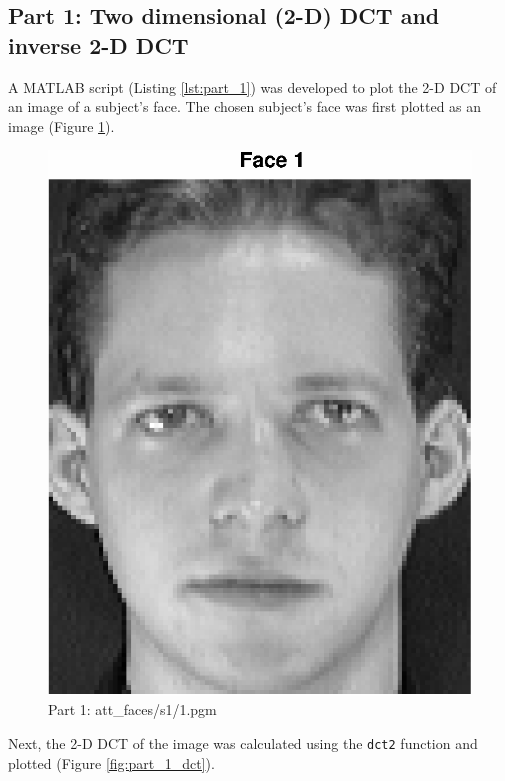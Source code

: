 \documentclass[conference]{IEEEtran}
\begin{document}
\subsection{Part 1: Two dimensional (2-D) DCT and inverse 2-D DCT}

A MATLAB\texttrademark{} script (Listing \ref{lst:part_1}) was developed to plot
the 2-D DCT of an image of a subject's face. The chosen subject's face was first
plotted as an image (Figure \ref{fig:part_1_face}).

  \begin{figure}[H]
    \centering
    \includegraphics[scale=0.5]{./img/part_1_face}
    \caption{Part 1: att\_faces/s1/1.pgm}
    \label{fig:part_1_face}
  \end{figure}

  Next, the 2-D DCT of the image was calculated using the \texttt{dct2}
  function and plotted (Figure \ref{fig:part_1_dct}).
\end{document}
